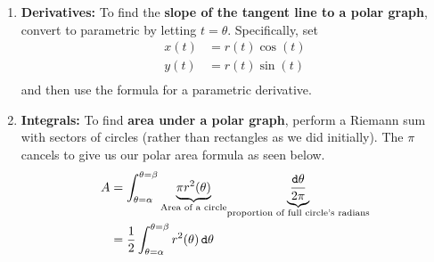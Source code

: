 \begin{enumerate}
\begin{enumerate}
\item {\bf Derivatives:} To find the {\bf slope of the tangent line to a polar graph}, convert to parametric by letting $t=\theta$.  Specifically, set \begin{align*}
x(t)&=r(t)\cos\left(t\right)\\
y(t)&=r(t)\sin\left(t\right) \\
\end{align*} and then use the formula for a parametric derivative.
\item {\bf Integrals:} To find {\bf area under a polar graph}, perform a Riemann sum with sectors of circles (rather than rectangles as we did initially).  The $\pi$ cancels to give us our polar area formula as seen below.   \begin{align*}
A&=\int_{\theta=\alpha}^{\theta=\beta}  \underset{\text{Area of a circle}}{\underbrace{\pi r^2(\theta)}} \underset{\text{proportion of full circle's radians}}{\underbrace{\frac{\mathop{}\!\mathtt{d} \theta}{2\pi}}}\\
&=\frac{1}{2}\int_{\theta=\alpha}^{\theta=\beta}  r^2(\theta) \mathop{}\!\mathtt{d} \theta
\end{align*}
\end{enumerate}
\end{enumerate}